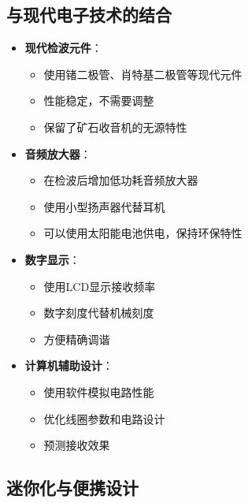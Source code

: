 \documentclass[12pt,UTF8]{ctexbook}
\begin{document}
\subsection{与现代电子技术的结合}

\begin{itemize}[leftmargin=3.5em]
    \item \textbf{现代检波元件}：
        \begin{itemize}[leftmargin=3.5em]
            \item 使用锗二极管、肖特基二极管等现代元件
            \item 性能稳定，不需要调整
            \item 保留了矿石收音机的无源特性
        \end{itemize}
    \item \textbf{音频放大器}：
        \begin{itemize}[leftmargin=3.5em]
            \item 在检波后增加低功耗音频放大器
            \item 使用小型扬声器代替耳机
            \item 可以使用太阳能电池供电，保持环保特性
        \end{itemize}
    \item \textbf{数字显示}：
        \begin{itemize}[leftmargin=3.5em]
            \item 使用LCD显示接收频率
            \item 数字刻度代替机械刻度
            \item 方便精确调谐
        \end{itemize}
    \item \textbf{计算机辅助设计}：
        \begin{itemize}[leftmargin=3.5em]
            \item 使用软件模拟电路性能
            \item 优化线圈参数和电路设计
            \item 预测接收效果
        \end{itemize}
\end{itemize}

\subsection{迷你化与便携设计}
\end{document}
